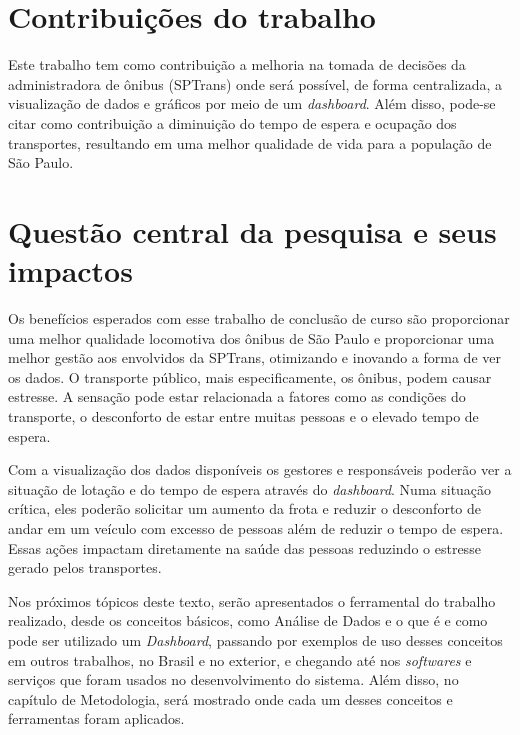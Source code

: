 \section{Contribuições do trabalho}
\indent
\par Este trabalho tem como contribuição a melhoria na tomada de decisões da administradora de ônibus (SPTrans) onde será possível, de forma centralizada, a visualização de dados e gráficos por meio de um \textit{dashboard}. Além disso, pode-se citar como contribuição a diminuição do tempo de espera e ocupação dos transportes, resultando em uma melhor qualidade de vida para a população de São Paulo.

\section{Questão central da pesquisa e seus impactos}
\indent
\par Os benefícios esperados com esse trabalho de conclusão de curso são proporcionar uma melhor qualidade locomotiva dos ônibus de São Paulo e proporcionar uma melhor gestão aos envolvidos da SPTrans, otimizando e inovando a forma de ver os dados. O transporte público, mais especificamente, os ônibus, podem causar estresse. A sensação pode estar relacionada a fatores como as condições do transporte, o desconforto de estar entre muitas pessoas e o elevado tempo de espera.
\par Com a visualização dos dados disponíveis os gestores e responsáveis poderão ver a situação de lotação e do tempo de espera através do \textit{dashboard}. Numa situação crítica, eles poderão solicitar um aumento da frota e reduzir o desconforto de andar em um veículo com excesso de pessoas além de reduzir o tempo de espera. Essas ações impactam diretamente na saúde das pessoas reduzindo o estresse gerado pelos transportes.
\par Nos próximos tópicos deste texto, serão apresentados o ferramental do trabalho realizado, desde os conceitos básicos, como Análise de Dados e o que é e como pode ser utilizado um \textit{Dashboard}, passando por exemplos de uso desses conceitos em outros trabalhos, no Brasil e no exterior, e chegando até nos \textit{softwares} e serviços que foram usados no desenvolvimento do sistema. Além disso, no capítulo de Metodologia, será mostrado onde cada um desses conceitos e ferramentas foram aplicados.

